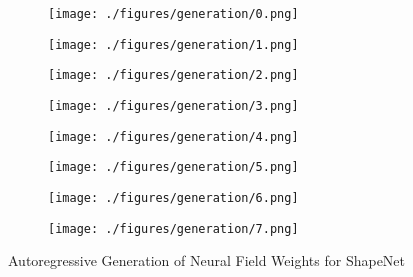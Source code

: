 \begin{figure*}[t]
  \centering
  \begin{subfigure}{.24\linewidth}
    \centering
    \texttt{[image: ./figures/generation/0.png]}
  \end{subfigure}
  \begin{subfigure}{.24\linewidth}
    \centering
    \texttt{[image: ./figures/generation/1.png]}
  \end{subfigure}
  \begin{subfigure}{.24\linewidth}
    \centering
    \texttt{[image: ./figures/generation/2.png]}
  \end{subfigure}
  \begin{subfigure}{.24\linewidth}
    \centering
    \texttt{[image: ./figures/generation/3.png]}
  \end{subfigure}
  \begin{subfigure}{.24\linewidth}
    \centering
    \texttt{[image: ./figures/generation/4.png]}
  \end{subfigure}
  \begin{subfigure}{.24\linewidth}
    \centering
    \texttt{[image: ./figures/generation/5.png]}
  \end{subfigure}
  \begin{subfigure}{.24\linewidth}
    \centering
    \texttt{[image: ./figures/generation/6.png]}
  \end{subfigure}
  \begin{subfigure}{.24\linewidth}
    \centering
    \texttt{[image: ./figures/generation/7.png]}
  \end{subfigure}

  \caption{\label{fig:generation} Autoregressive Generation of Neural Field Weights for ShapeNet}

\end{figure*}



